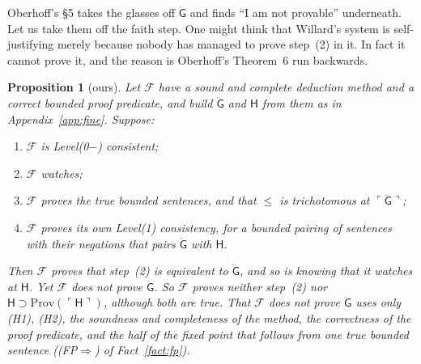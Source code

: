 \documentclass[11pt]{article}
\newcommand{\F}{\mathcal{F}}
\newcommand{\G}{\ddot{\mathsf{G}}}          %
\newcommand{\Hs}{\mathsf{H}}                %
\newcommand{\Prov}{\mathrm{Prov}}
\newcommand{\gn}[1]{\ulcorner #1\urcorner}  %
\theoremstyle{plain}
\newtheorem{proposition}[theorem]{Proposition}
\theoremstyle{definition}
\begin{document}
Oberhoff's \S5 takes the glasses off $\G$ and finds ``I am not provable''
underneath. Let us take them off the faith step. One might think that
Willard's system is self-justifying merely because nobody has managed to
prove step~(2) in it. In fact it cannot prove it, and the reason is
Oberhoff's Theorem~6 run backwards.

\begin{proposition}[ours]\label{prop:backwards}
Let $\F$ have a sound and complete deduction method and a correct bounded
proof predicate, and build $\G$ and $\Hs$ from them as in
Appendix~\ref{app:fine}. Suppose:
\begin{enumerate}[label=(H\arabic*), leftmargin=3em]
\item $\F$ is Level(0$-$) consistent;
\item $\F$ watches;
\item $\F$ proves the true bounded sentences, and that $\le$ is trichotomous at
  $\gn{\G}$;
\item $\F$ proves its own Level(1) consistency, for a bounded pairing of
  sentences with their negations that pairs $\G$ with $\Hs$.
\end{enumerate}
Then $\F$ proves that step~(2) is equivalent to $\G$, and so is knowing that
it watches at $\Hs$. Yet $\F$ does not prove $\G$. So $\F$ proves neither
step~(2) nor $\Hs \supset \Prov(\gn{\Hs})$, although both are true. That $\F$
does not prove $\G$ uses only (H1), (H2), the soundness and completeness of
the method, the correctness of the proof predicate, and the half of the fixed
point that follows from one true bounded sentence ((FP$\Rightarrow$) of
Fact~\ref{fact:fp}).
\end{proposition}
\end{document}
